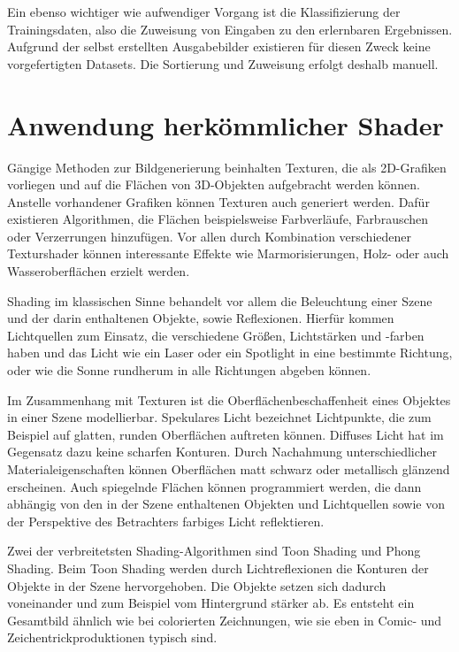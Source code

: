 Ein ebenso wichtiger wie aufwendiger Vorgang ist die Klassifizierung der Trainingsdaten, also die Zuweisung von Eingaben zu den erlernbaren Ergebnissen. Aufgrund der selbst erstellten Ausgabebilder existieren für diesen Zweck keine vorgefertigten Datasets. Die Sortierung und Zuweisung erfolgt deshalb manuell.


\section{Anwendung herkömmlicher Shader}
\label{sec:shader}
Gängige Methoden zur Bildgenerierung beinhalten Texturen, die als 2D-Grafiken vorliegen und auf die Flächen von 3D-Objekten aufgebracht werden können. Anstelle vorhandener Grafiken können Texturen auch generiert werden. Dafür existieren Algorithmen, die Flächen beispielsweise Farbverläufe, Farbrauschen oder Verzerrungen hinzufügen. Vor allen durch Kombination verschiedener Texturshader können interessante Effekte wie Marmorisierungen, Holz- oder auch Wasseroberflächen erzielt werden.

Shading im klassischen Sinne behandelt vor allem die Beleuchtung einer Szene und der darin enthaltenen Objekte, sowie Reflexionen. Hierfür kommen Lichtquellen zum Einsatz, die verschiedene Größen, Lichtstärken und -farben haben und das Licht wie ein Laser oder ein Spotlight in eine bestimmte Richtung, oder wie die Sonne rundherum in alle Richtungen abgeben können.

Im Zusammenhang mit Texturen ist die Oberflächenbeschaffenheit eines Objektes in einer Szene modellierbar. Spekulares Licht bezeichnet Lichtpunkte, die zum Beispiel auf glatten, runden Oberflächen auftreten können. Diffuses Licht hat im Gegensatz dazu keine scharfen Konturen. Durch Nachahmung unterschiedlicher Materialeigenschaften können Oberflächen matt schwarz oder metallisch glänzend erscheinen. Auch spiegelnde Flächen können programmiert werden, die dann abhängig von den in der Szene enthaltenen Objekten und Lichtquellen sowie von der Perspektive des Betrachters farbiges Licht reflektieren.

Zwei der verbreitetsten Shading-Algorithmen sind Toon Shading und Phong Shading. Beim Toon Shading werden durch Lichtreflexionen die Konturen der Objekte in der Szene hervorgehoben. Die Objekte setzen sich dadurch voneinander und zum Beispiel vom Hintergrund stärker ab. Es entsteht ein Gesamtbild ähnlich wie bei colorierten Zeichnungen, wie sie eben in Comic- und Zeichentrickproduktionen typisch sind.

